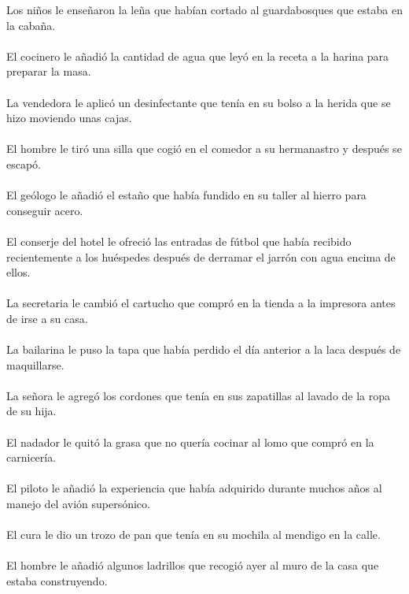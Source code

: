 Los ni\~{n}os le ense\~{n}aron la le\~{n}a que hab\'{i}an cortado al guardabosques que estaba en la caba\~{n}a.	\\	\\
El cocinero le a\~{n}adi\'{o} la cantidad de agua que ley\'{o} en la receta a la harina para preparar la masa.	\\	\\
La vendedora le aplic\'{o} un desinfectante que ten\'{i}a en su bolso a la herida que se hizo moviendo unas cajas.	\\	\\
El hombre le tir\'{o} una silla que cogi\'{o} en el comedor a su hermanastro y despu\'{e}s se escap\'{o}.	\\	\\
El ge\'{o}logo le a\~{n}adi\'{o} el esta\~{n}o que hab\'{i}a fundido en su taller al hierro para conseguir acero.	\\	\\
El conserje del hotel le ofreci\'{o} las entradas de f\'{u}tbol que hab\'{i}a recibido recientemente a los hu\'{e}spedes despu\'{e}s de derramar el  jarr\'{o}n con agua encima de ellos.	\\	\\
La secretaria le cambi\'{o} el cartucho que compr\'{o} en la tienda a la impresora antes de irse a su casa.	\\	\\
La bailarina le puso la tapa que hab\'{i}a perdido el d\'{i}a anterior a la laca despu\'{e}s de maquillarse.	\\	\\
La se\~{n}ora le agreg\'{o} los cordones que ten\'{i}a en sus zapatillas al lavado de la ropa de su hija.	\\	\\
El nadador le quit\'{o} la grasa que no quer\'{i}a cocinar al lomo que compr\'{o} en la carnicer\'{i}a.	\\	\\
El piloto le a\~{n}adi\'{o} la experiencia que hab\'{i}a adquirido durante muchos a\~{n}os al manejo del avi\'{o}n supers\'{o}nico.	\\	\\
El cura le dio un trozo de pan que ten\'{i}a en su mochila al mendigo en la calle.	\\	\\
El hombre le a\~{n}adi\'{o} algunos ladrillos que recogi\'{o} ayer al muro de la casa que estaba construyendo.	\\	\\
